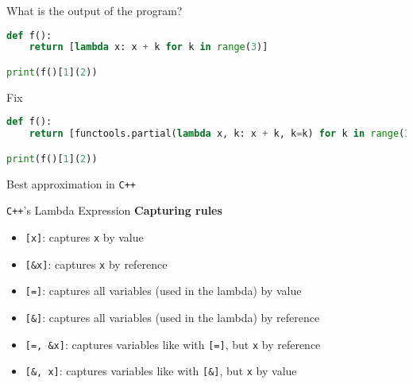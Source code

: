 \begin{frame}[fragile]{What is the output of the program?}
    \begin{lstlisting}[language=python]
def f():
    return [lambda x: x + k for k in range(3)]

print(f()[1](2))
    \end{lstlisting}


\end{frame}

\begin{frame}[fragile]{Fix}
    \begin{lstlisting}[language=python]
def f():
    return [functools.partial(lambda x, k: x + k, k=k) for k in range(3)]

print(f()[1](2))
    \end{lstlisting}
\end{frame}

\begin{frame}[fragile]{Best approximation in \texttt{C++}}
\end{frame}

\begin{frame}[plain]
    \centering
\end{frame}

\begin{frame}[fragile]{\texttt{C++}'s Lambda Expression}
    \textbf{Capturing rules}
    \begin{itemize}
        \item \texttt{[x]}: captures \texttt{x} by value
        \item \texttt{[\&x]}: captures \texttt{x} by reference
        \item \texttt{[=]}: captures all variables (used in the lambda) by value
        \item \texttt{[\&]}: captures all variables (used in the lambda) by reference
        \item \texttt{[=, \&x]}: captures variables like with \texttt{[=]}, but \texttt{x} by reference
        \item \texttt{[\&, x]}: captures variables like with \texttt{[\&]}, but \texttt{x} by value
    \end{itemize}
\end{frame}

